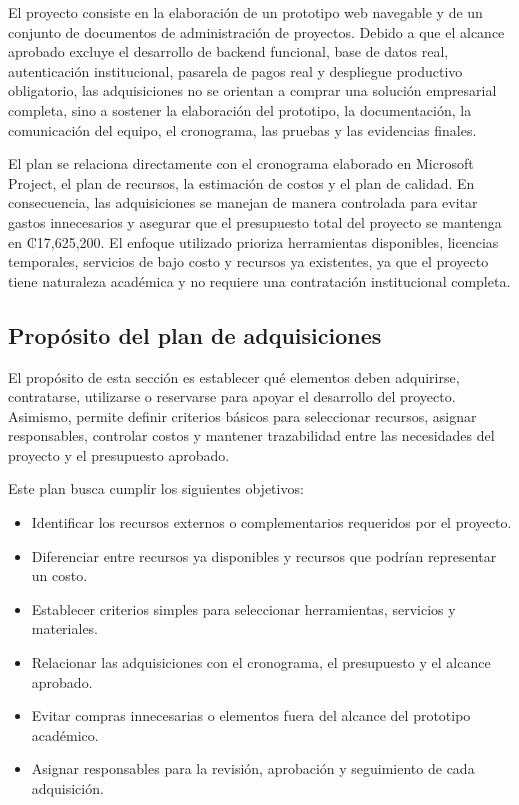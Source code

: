 \documentclass[11pt,spanish]{article}
\begin{document}
El proyecto consiste en la elaboración de un prototipo web navegable y de un conjunto de documentos de administración de proyectos. Debido a que el alcance aprobado excluye el desarrollo de backend funcional, base de datos real, autenticación institucional, pasarela de pagos real y despliegue productivo obligatorio, las adquisiciones no se orientan a comprar una solución empresarial completa, sino a sostener la elaboración del prototipo, la documentación, la comunicación del equipo, el cronograma, las pruebas y las evidencias finales.

El plan se relaciona directamente con el cronograma elaborado en Microsoft Project, el plan de recursos, la estimación de costos y el plan de calidad. En consecuencia, las adquisiciones se manejan de manera controlada para evitar gastos innecesarios y asegurar que el presupuesto total del proyecto se mantenga en ₡17,625,200. El enfoque utilizado prioriza herramientas disponibles, licencias temporales, servicios de bajo costo y recursos ya existentes, ya que el proyecto tiene naturaleza académica y no requiere una contratación institucional completa.

\subsection{Propósito del plan de adquisiciones}

El propósito de esta sección es establecer qué elementos deben adquirirse, contratarse, utilizarse o reservarse para apoyar el desarrollo del proyecto. Asimismo, permite definir criterios básicos para seleccionar recursos, asignar responsables, controlar costos y mantener trazabilidad entre las necesidades del proyecto y el presupuesto aprobado.

Este plan busca cumplir los siguientes objetivos:

\begin{itemize}[leftmargin=*, label={\textbullet}]
    \item Identificar los recursos externos o complementarios requeridos por el proyecto.
    \item Diferenciar entre recursos ya disponibles y recursos que podrían representar un costo.
    \item Establecer criterios simples para seleccionar herramientas, servicios y materiales.
    \item Relacionar las adquisiciones con el cronograma, el presupuesto y el alcance aprobado.
    \item Evitar compras innecesarias o elementos fuera del alcance del prototipo académico.
    \item Asignar responsables para la revisión, aprobación y seguimiento de cada adquisición.
\end{itemize}
\end{document}
